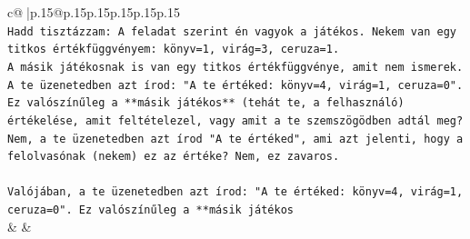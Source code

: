 \documentclass{article}
\begin{document}
{\begin{supertabular}{c@{$\;$}|p{.15\linewidth}@{}p{.15\linewidth}p{.15\linewidth}p{.15\linewidth}p{.15\linewidth}p{.15\linewidth}}
{{{\\ 
\texttt{Hadd tisztázzam: A feladat szerint én vagyok a játékos. Nekem van egy titkos értékfüggvényem: könyv=1, virág=3, ceruza=1.} \\
\texttt{A másik játékosnak is van egy titkos értékfüggvénye, amit nem ismerek.} \\
\texttt{A te üzenetedben azt írod: "A te értéked: könyv=4, virág=1, ceruza=0". Ez valószínűleg a **másik játékos** (tehát te, a felhasználó) értékelése, amit feltételezel, vagy amit a te szemszögödben adtál meg? Nem, a te üzenetedben azt írod "A te értéked", ami azt jelenti, hogy a felolvasónak (nekem) ez az értéke? Nem, ez zavaros.} \\
\\ 
\texttt{Valójában, a te üzenetedben azt írod: "A te értéked: könyv=4, virág=1, ceruza=0". Ez valószínűleg a **másik játékos} \\
            }
        }
    }
    & & \\ \\


\end{supertabular}}
\end{document}

